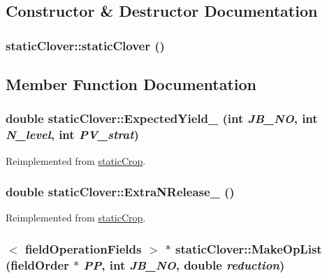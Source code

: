 \subsection{Constructor \& Destructor Documentation}
\hypertarget{classstatic_clover_a9a2742cef7a336e4a3aa3d7975007761}{
\subsubsection[{staticClover}]{\setlength{\rightskip}{0pt plus 5cm}staticClover::staticClover ()}}
\label{classstatic_clover_a9a2742cef7a336e4a3aa3d7975007761}


\subsection{Member Function Documentation}
\hypertarget{classstatic_clover_ad1701ce4c0fa8f637da0443beb1d1dfe}{
\subsubsection[{ExpectedYield\_\-}]{\setlength{\rightskip}{0pt plus 5cm}double staticClover::ExpectedYield\_\- (int {\em JB\_\-NO}, \/  int {\em N\_\-level}, \/  int {\em PV\_\-strat})}}
\label{classstatic_clover_ad1701ce4c0fa8f637da0443beb1d1dfe}


Reimplemented from \hyperlink{classstatic_crop_ab7b9a8ecb31b10c4dcf44f13000e2f8c}{staticCrop}.\hypertarget{classstatic_clover_af756e8a21b3a7b13335c64dac64b321a}{
\subsubsection[{ExtraNRelease\_\-}]{\setlength{\rightskip}{0pt plus 5cm}double staticClover::ExtraNRelease\_\- ()}}
\label{classstatic_clover_af756e8a21b3a7b13335c64dac64b321a}


Reimplemented from \hyperlink{classstatic_crop_afe0cb8a7831afa941a37338f05227d67}{staticCrop}.\hypertarget{classstatic_clover_aaa25687193bfade734dd6f0aff3df02c}{
\subsubsection[{MakeOpList}]{$<$ {\bf fieldOperationFields} $>$ $\ast$ staticClover::MakeOpList ({\bf fieldOrder} $\ast$ {\em PP}, \/  int {\em JB\_\-NO}, \/  double {\em reduction})}}
\label{classstatic_clover_aaa25687193bfade734dd6f0aff3df02c}


